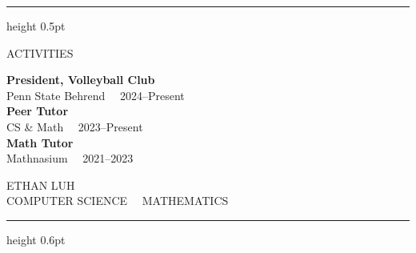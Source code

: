 \documentclass[10pt,letterpaper]{article}
\newcommand{\sechead}[1]{{\spacedboldfont\color{darktext}\fontsize{9.5}{11}\selectfont #1}\par\vspace{5pt}}
\begin{document}
\begin{lrbox}{\sidebarbox}
\begin{minipage}[t]{2.55in}
\begin{minipage}[t]{2.16in}
\vspace{10pt}
{\color{lightrule}\hrule height 0.5pt}
\vspace{14pt}

\sechead{ACTIVITIES}
{\fontsize{8.8}{12}\selectfont\color{darktext}
\textbf{President, Volleyball Club}\\
{\fontsize{8.3}{11.5}\selectfont\color{midgray} Penn State Behrend \ \textbullet\ 2024--Present}\\[9pt]
\textbf{Peer Tutor}\\
{\fontsize{8.3}{11.5}\selectfont\color{midgray} CS \& Math \ \textbullet\ 2023--Present}\\[9pt]
\textbf{Math Tutor}\\
{\fontsize{8.3}{11.5}\selectfont\color{midgray} Mathnasium \ \textbullet\ 2021--2023}
}

\end{minipage}
\end{minipage}
\end{lrbox}

\settoheight{\sidebarht}{\usebox{\sidebarbox}}
\addtolength{\sidebarht}{\dp\sidebarbox}

\newsavebox{\headerbox}
\newlength{\headerht}

\begin{lrbox}{\headerbox}
\begin{minipage}{\paperwidth}
\begin{center}
\vspace{0.06in}
{\fontsize{27}{29}\selectfont\spacedfont\color{darktext} ETHAN LUH}\\[7pt]
{\spacedfont\fontsize{9.5}{12}\selectfont\color{midgray} COMPUTER SCIENCE \ \textbullet\ MATHEMATICS}
\end{center}
\vspace{0.26in}
{\color{lightrule}\hrule height 0.6pt}
\end{minipage}
\end{lrbox}

\settoheight{\headerht}{\usebox{\headerbox}}
\addtolength{\headerht}{\dp\headerbox}

\newlength{\colht}
\setlength{\colht}{\textheight}
\addtolength{\colht}{-\headerht}
\addtolength{\colht}{-2pt}
\end{document}
